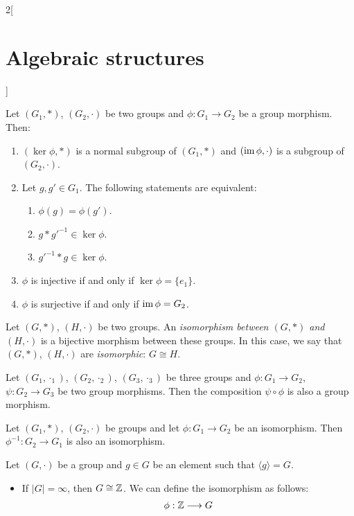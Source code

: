 \documentclass[../../../main.tex]{subfiles}
\begin{document}
\begin{multicols}{2}[\section{Algebraic structures}]
\begin{prop}
    Let $(G_1,*)$, $(G_2,\cdot)$ be two groups and $\phi:G_1\rightarrow G_2$ be a group morphism. Then:
    \begin{enumerate}
        \item $(\ker\phi,*)$ is a normal subgroup of $(G_1,*)$ and $(\operatorname{im}\phi,\cdot)$ is a subgroup of $(G_2,\cdot)$.
        \item Let $g,g'\in G_1$. The following statements are equivalent:
        \begin{enumerate}
            \item $\phi(g)=\phi(g')$.
            \item $g*g'^{-1}\in\ker\phi$.
            \item $g'^{-1}*g\in\ker\phi$.
        \end{enumerate}
        \item $\phi$ is injective if and only if $\ker\phi=\{e_1\}$.
        \item $\phi$ is surjective if and only if $\operatorname{im}\phi=G_2$.
    \end{enumerate}
\end{prop}
\begin{definition}
    Let $(G,*)$, $(H,\cdot)$ be two groups. An \textit{isomorphism between $(G,*)$ and $(H,\cdot)$} is a bijective morphism between these groups. In this case, we say that $(G,*)$, $(H,\cdot)$ are \textit{isomorphic}: $G\cong H$.
\end{definition}
\begin{prop}
    Let $(G_1,\cdot_1)$, $(G_2,\cdot_2)$, $(G_3,\cdot_3)$ be three groups and $\phi:G_1\rightarrow G_2$, $\psi:G_2\rightarrow G_3$ be two group morphisms. Then the composition $\psi\circ\phi$ is also a group morphism.
\end{prop}
\begin{prop}
    Let $(G_1,*)$, $(G_2,\cdot)$ be groups and let $\phi: G_1\rightarrow G_2$ be an isomorphism. Then $\phi^{-1}: G_2\rightarrow G_1$ is also an isomorphism.
\end{prop}
\begin{theorem}
    Let $(G,\cdot)$ be a group and $g\in G$ be an element such that $\langle g\rangle=G$.
    \begin{itemize}
        \item If $|G|=\infty$, then $G\cong\mathbb{Z} $. We can define the isomorphism as follows: 
        \begin{align*}
            \phi:\ZZ &\longrightarrow G\\

\end{align*}
\end{itemize}
\end{theorem}
\end{multicols}
\end{document}
